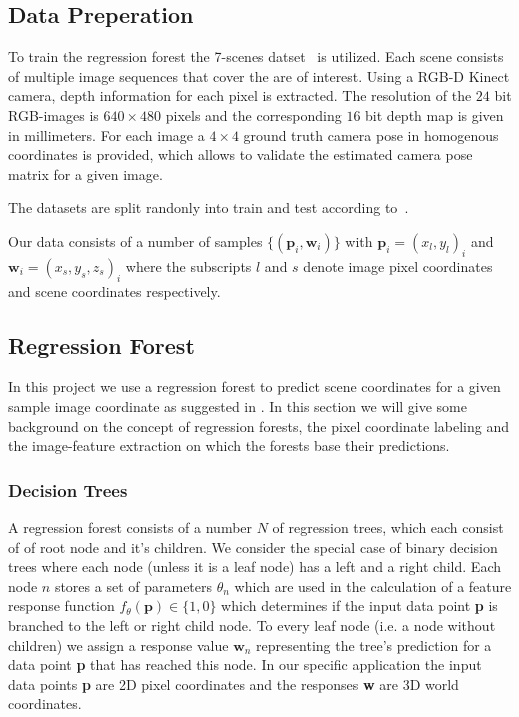 \documentclass[final]{cvpr}
\begin{document}
\subsection{Data Preperation}
To train the regression forest the 7-scenes datset~\cite{glocker2013} is utilized. 
Each scene consists of multiple image sequences that cover the are of interest. Using a RGB-D 
Kinect camera, depth information for each pixel is extracted. The resolution of the $24$ 
bit RGB-images is $640\times480$ pixels and the corresponding $16$ bit depth map is given 
in millimeters. For each image a $4\times4$ ground truth camera pose in homogenous coordinates 
is provided, which allows to validate the estimated camera pose matrix for a given image. 

The datasets are split randonly into train and test according to~\cite[Table 1]{shotton2013}. 

Our data consists of a number of samples $\{(\textbf{p}_i, \textbf{w}_i)\}$ with
$\textbf{p}_i = (x_l, y_l)_i$ and $\textbf{w}_i = (x_s, y_s, z_s)_i$ where the subscripts
$l$ and $s$ denote image pixel coordinates and scene coordinates respectively.\\

\subsection{Regression Forest}

In this project we use a regression forest to predict scene coordinates for a given
sample image coordinate as suggested in \cite{shotton2013}. In this section we will
give some background on the concept of regression forests, the pixel coordinate
labeling and the image-feature extraction on which the forests base their predictions.\\

\subsubsection{Decision Trees}
A regression forest consists of a number $N$ of regression trees, which each consist of
of root node and it's children. We consider the special case of binary decision trees
where each node (unless it is a leaf node) has a left and a right child. Each node $n$
stores a set of parameters $\theta_n$ which are used in the calculation of a
feature response function $f_{\theta}(\textbf{p}) \in \{1, 0\}$ which determines if the input
data point \textbf{p} is branched to the left or right child node. To every leaf node
(i.e. a node without children) we assign a response value $\textbf{w}_n$ representing
the tree's prediction for a data point \textbf{p} that has reached this node. In our
specific application the input data points \textbf{p} are 2D pixel coordinates and the
responses \textbf{w} are 3D world coordinates.\\
\end{document}
